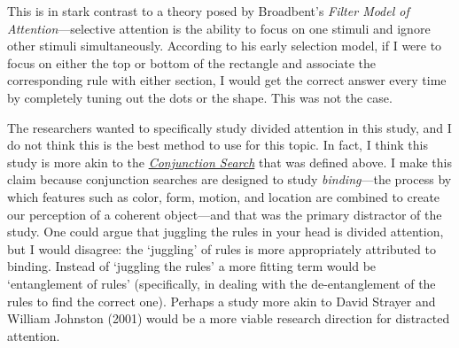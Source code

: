 \documentclass[stu,12pt,floatsintext]{apa7}
\begin{document}
    This is in stark contrast to a theory posed by Broadbent's \textit{Filter Model of Attention}---selective attention is the ability to focus on one stimuli and ignore other stimuli simultaneously. According to his early selection model, if I were to focus on either the top or bottom of the rectangle and associate the corresponding rule with either section, I would get the correct answer every time by completely tuning out the dots or the shape. This was not the case.

    \hypertarget{last}{}The researchers wanted to specifically study divided attention in this study, and I do not think this is the best method to use for this topic. In fact, I think this study is more akin to the \hyperlink{Conjunction}{\textit{Conjunction Search}} that was defined above. I make this claim because conjunction searches are designed to study \textit{binding}---the process by which features such as color, form, motion, and location are combined to create our perception of a coherent object---and that was the primary distractor of the study. One could argue that juggling the rules in your head is divided attention, but I would disagree: the `juggling' of rules is more appropriately attributed to binding. Instead of `juggling the rules' a more fitting term would be `entanglement of rules' (specifically, in dealing with the de-entanglement of the rules to find the correct one). Perhaps a study more akin to David Strayer and William Johnston (2001) would be a more viable research direction for distracted attention.

\newpage
\end{document}
